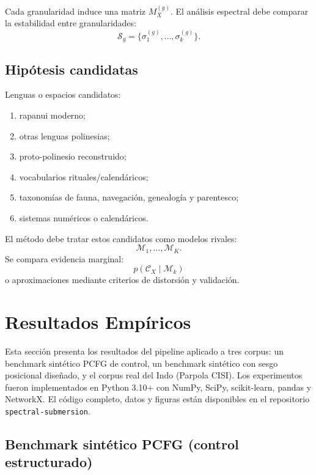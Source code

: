 \documentclass[11pt,a4paper]{article}
\newcommand{\1}{\mathbf{1}}
\numberwithin{equation}{section}
\begin{document}
Cada granularidad induce una matriz \(M_X^{(g)}\). El análisis espectral debe comparar la estabilidad entre granularidades:
\[
    \mathcal{S}_g
    =
    \{\sigma_1^{(g)},\dots,\sigma_k^{(g)}\}.
\]

\subsection{Hipótesis candidatas}

Lenguas o espacios candidatos:
\begin{enumerate}[label=(\roman*)]
    \item rapanui moderno;
    \item otras lenguas polinesias;
    \item proto-polinesio reconstruido;
    \item vocabularios rituales/calendáricos;
    \item taxonomías de fauna, navegación, genealogía y parentesco;
    \item sistemas numéricos o calendáricos.
\end{enumerate}

El método debe tratar estos candidatos como modelos rivales:
\[
    \mathcal{M}_1,\dots,\mathcal{M}_K.
\]
Se compara evidencia marginal:
\[
    p(\mathcal{C}_X\mid \mathcal{M}_k)
\]
o aproximaciones mediante criterios de distorsión y validación.

\section{Resultados Empíricos}

Esta sección presenta los resultados del pipeline aplicado a tres corpus: un benchmark sintético PCFG de control, un benchmark sintético con sesgo posicional diseñado, y el corpus real del Indo (Parpola CISI). Los experimentos fueron implementados en Python 3.10+ con NumPy, SciPy, scikit-learn, pandas y NetworkX. El código completo, datos y figuras están disponibles en el repositorio \texttt{spectral-submersion}.

\subsection{Benchmark sintético PCFG (control estructurado)}
\end{document}
